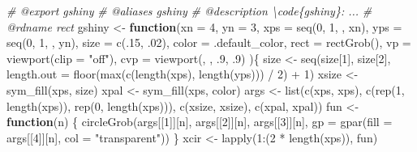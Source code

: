 \documentclass[
]{article}
\newenvironment{Shaded}{\begin{snugshade}}{\end{snugshade}}
\newcommand{\AttributeTok}[1]{\textcolor[rgb]{0.77,0.63,0.00}{#1}}
\newcommand{\CommentTok}[1]{\textcolor[rgb]{0.56,0.35,0.01}{\textit{#1}}}
\newcommand{\ControlFlowTok}[1]{\textcolor[rgb]{0.13,0.29,0.53}{\textbf{#1}}}
\newcommand{\DecValTok}[1]{\textcolor[rgb]{0.00,0.00,0.81}{#1}}
\newcommand{\FunctionTok}[1]{\textcolor[rgb]{0.00,0.00,0.00}{#1}}
\newcommand{\NormalTok}[1]{#1}
\newcommand{\OtherTok}[1]{\textcolor[rgb]{0.56,0.35,0.01}{#1}}
\newcommand{\SpecialCharTok}[1]{\textcolor[rgb]{0.00,0.00,0.00}{#1}}
\newcommand{\StringTok}[1]{\textcolor[rgb]{0.31,0.60,0.02}{#1}}
\begin{document}
\begin{Shaded}
\begin{Highlighting}[]
\CommentTok{\#\textquotesingle{} @export gshiny}
\CommentTok{\#\textquotesingle{} @aliases gshiny}
\CommentTok{\#\textquotesingle{} @description \textbackslash{}code\{gshiny\}: ...}
\CommentTok{\#\textquotesingle{} @rdname rect}
\NormalTok{gshiny }\OtherTok{\textless{}{-}} \ControlFlowTok{function}\NormalTok{(}\AttributeTok{xn =} \DecValTok{4}\NormalTok{, }\AttributeTok{yn =} \DecValTok{3}\NormalTok{,}
  \AttributeTok{xps =} \FunctionTok{seq}\NormalTok{(}\DecValTok{0}\NormalTok{, }\DecValTok{1}\NormalTok{, , xn), }\AttributeTok{yps =} \FunctionTok{seq}\NormalTok{(}\DecValTok{0}\NormalTok{, }\DecValTok{1}\NormalTok{, , yn),}
  \AttributeTok{size =} \FunctionTok{c}\NormalTok{(.}\DecValTok{15}\NormalTok{, .}\DecValTok{02}\NormalTok{),}
  \AttributeTok{color =}\NormalTok{ .default\_color,}
  \AttributeTok{rect =} \FunctionTok{rectGrob}\NormalTok{(),}
  \AttributeTok{vp =} \FunctionTok{viewport}\NormalTok{(}\AttributeTok{clip =} \StringTok{"off"}\NormalTok{),}
  \AttributeTok{cvp =} \FunctionTok{viewport}\NormalTok{(, , .}\DecValTok{9}\NormalTok{, .}\DecValTok{9}\NormalTok{)}
\NormalTok{  )\{}
\NormalTok{  size }\OtherTok{\textless{}{-}} \FunctionTok{seq}\NormalTok{(size[}\DecValTok{1}\NormalTok{], size[}\DecValTok{2}\NormalTok{], }\AttributeTok{length.out =} \FunctionTok{floor}\NormalTok{(}\FunctionTok{max}\NormalTok{(}\FunctionTok{c}\NormalTok{(}\FunctionTok{length}\NormalTok{(xps), }\FunctionTok{length}\NormalTok{(yps))) }\SpecialCharTok{/} \DecValTok{2}\NormalTok{) }\SpecialCharTok{+} \DecValTok{1}\NormalTok{)}
\NormalTok{  xsize }\OtherTok{\textless{}{-}} \FunctionTok{sym\_fill}\NormalTok{(xps, size)}
\NormalTok{  xpal }\OtherTok{\textless{}{-}} \FunctionTok{sym\_fill}\NormalTok{(xps, color)}
\NormalTok{  args }\OtherTok{\textless{}{-}} \FunctionTok{list}\NormalTok{(}\FunctionTok{c}\NormalTok{(xps, xps), }\FunctionTok{c}\NormalTok{(}\FunctionTok{rep}\NormalTok{(}\DecValTok{1}\NormalTok{, }\FunctionTok{length}\NormalTok{(xps)), }\FunctionTok{rep}\NormalTok{(}\DecValTok{0}\NormalTok{, }\FunctionTok{length}\NormalTok{(xps))),}
    \FunctionTok{c}\NormalTok{(xsize, xsize), }\FunctionTok{c}\NormalTok{(xpal, xpal))}
\NormalTok{  fun }\OtherTok{\textless{}{-}} \ControlFlowTok{function}\NormalTok{(n) \{}
    \FunctionTok{circleGrob}\NormalTok{(args[[}\DecValTok{1}\NormalTok{]][n], args[[}\DecValTok{2}\NormalTok{]][n], args[[}\DecValTok{3}\NormalTok{]][n],}
      \AttributeTok{gp =} \FunctionTok{gpar}\NormalTok{(}\AttributeTok{fill =}\NormalTok{ args[[}\DecValTok{4}\NormalTok{]][n], }\AttributeTok{col =} \StringTok{"transparent"}\NormalTok{))}
\NormalTok{  \}}
\NormalTok{  xcir }\OtherTok{\textless{}{-}} \FunctionTok{lapply}\NormalTok{(}\DecValTok{1}\SpecialCharTok{:}\NormalTok{(}\DecValTok{2} \SpecialCharTok{*} \FunctionTok{length}\NormalTok{(xps)), fun)}

\end{Highlighting}
\end{Shaded}
\end{document}
